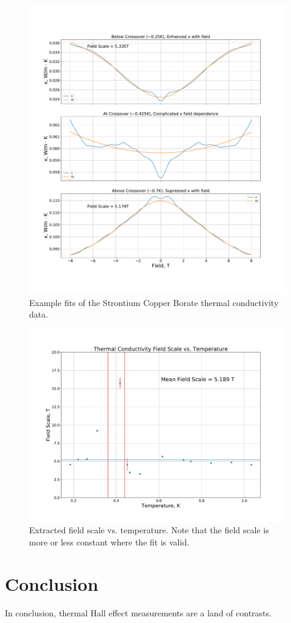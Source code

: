 \documentclass{thesis-umich}
\begin{document}
\begin{figure}
	\caption[Example fits of SCBO data.]{Example fits of the Strontium Copper Borate thermal conductivity data.}
	\includegraphics[width=\columnwidth]{figures/SCBO_kappa_vs_b_fits.pdf}
\end{figure}

\begin{figure}
	\caption[Extracted Field Scale vs. Temperature]{Extracted field scale vs. temperature. Note that the field scale is more or less constant where the fit is valid.}
	\includegraphics[width=\columnwidth]{figures/SCBO_field_scale.pdf}
\end{figure}

\chapter{Conclusion}
In conclusion, thermal Hall effect measurements are a land of contrasts.



\end{document}
